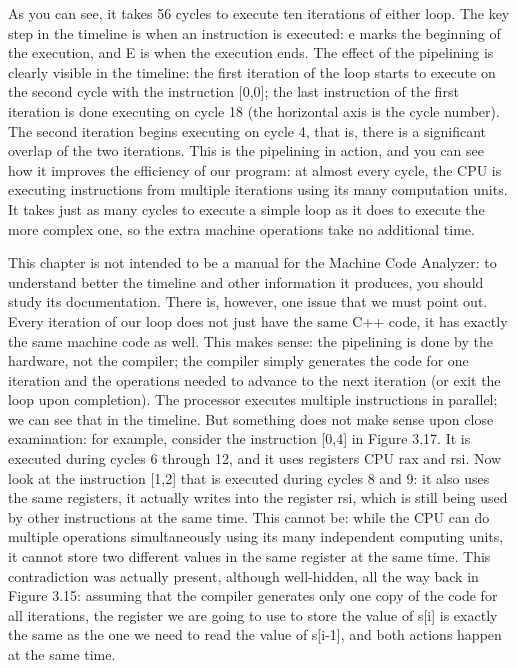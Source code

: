 As you can see, it takes 56 cycles to execute ten iterations of either loop. The key step in the timeline is when an instruction is executed: e marks the beginning of the execution, and E is when the execution ends. The effect of the pipelining is clearly visible in the timeline: the first iteration of the loop starts to execute on the second cycle with the instruction [0,0]; the last instruction of the first iteration is done executing on cycle 18 (the horizontal axis is the cycle number). The second iteration begins executing on cycle 4, that is, there is a significant overlap of the two iterations. This is the pipelining in action, and you can see how it improves the efficiency of our program: at almost every cycle, the CPU is executing instructions from multiple iterations using its many computation units. It takes just as many cycles to execute a simple loop as it does to execute the more complex one, so the extra machine operations take no additional time.

This chapter is not intended to be a manual for the Machine Code Analyzer: to understand better the timeline and other information it produces, you should study its documentation. There is, however, one issue that we must point out. Every iteration of our loop does not just have the same C++ code, it has exactly the same machine code as well. This makes sense: the pipelining is done by the hardware, not the compiler; the compiler simply generates the code for one iteration and the operations needed to advance to the next iteration (or exit the loop upon completion). The processor executes multiple instructions in parallel; we can see that in the timeline. But something does not make sense upon close examination: for example, consider the instruction [0,4] in Figure 3.17. It is executed during cycles 6 through 12, and it uses registers CPU rax and rsi. Now look at the instruction [1,2] that is executed during cycles 8 and 9: it also uses the same registers, it actually writes into the register rsi, which is still being used by other instructions at the same time. This cannot be: while the CPU can do multiple operations simultaneously using its many independent computing units, it cannot store two different values in the same register at the same time. This contradiction was actually present, although well-hidden, all the way back in Figure 3.15: assuming that the compiler generates only one copy of the code for all iterations, the register we are going to use to store the value of s[i] is exactly the same as the one we need to read the value of s[i-1], and both actions happen at the same time.

